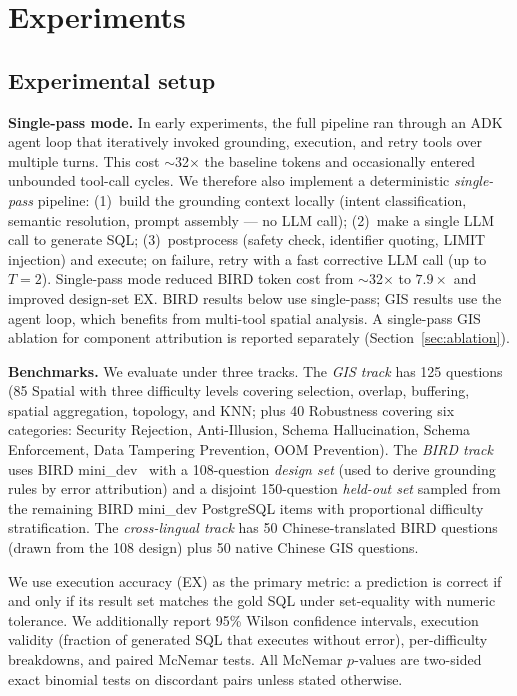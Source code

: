 \documentclass[11pt]{article}
\begin{document}
\section{Experiments}
\label{sec:experiments}

\subsection{Experimental setup}

\noindent\textbf{Single-pass mode.} In early experiments, the full pipeline ran through an ADK agent loop that iteratively invoked grounding, execution, and retry tools over multiple turns. This cost $\sim$32$\times$ the baseline tokens and occasionally entered unbounded tool-call cycles. We therefore also implement a deterministic \emph{single-pass} pipeline: (1)~build the grounding context locally (intent classification, semantic resolution, prompt assembly --- no LLM call); (2)~make a single LLM call to generate SQL; (3)~postprocess (safety check, identifier quoting, LIMIT injection) and execute; on failure, retry with a fast corrective LLM call (up to $T=2$). Single-pass mode reduced BIRD token cost from $\sim$32$\times$ to $7.9\times$ and improved design-set EX. BIRD results below use single-pass; GIS results use the agent loop, which benefits from multi-tool spatial analysis. A single-pass GIS ablation for component attribution is reported separately (Section~\ref{sec:ablation}).

\medskip
\noindent\textbf{Benchmarks.} We evaluate under three tracks. The \emph{GIS track} has 125 questions (85 Spatial with three difficulty levels covering selection, overlap, buffering, spatial aggregation, topology, and KNN; plus 40 Robustness covering six categories: Security Rejection, Anti-Illusion, Schema Hallucination, Schema Enforcement, Data Tampering Prevention, OOM Prevention). The \emph{BIRD track} uses BIRD mini\_dev~\cite{li2023bird} with a 108-question \emph{design set} (used to derive grounding rules by error attribution) and a disjoint 150-question \emph{held-out set} sampled from the remaining BIRD mini\_dev PostgreSQL items with proportional difficulty stratification. The \emph{cross-lingual track} has 50 Chinese-translated BIRD questions (drawn from the 108 design) plus 50 native Chinese GIS questions.

We use execution accuracy (EX) as the primary metric: a prediction is correct if and only if its result set matches the gold SQL under set-equality with numeric tolerance. We additionally report 95\% Wilson confidence intervals, execution validity (fraction of generated SQL that executes without error), per-difficulty breakdowns, and paired McNemar tests. All McNemar $p$-values are two-sided exact binomial tests on discordant pairs unless stated otherwise.
\end{document}
